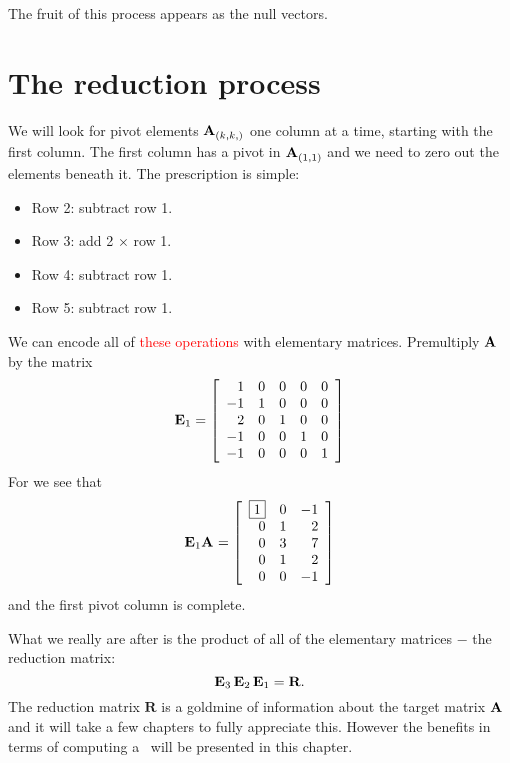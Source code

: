 The fruit of this process appears as the null vectors.


\section{The reduction process}
We will look for pivot elements $\textbf{A}^{\mathrm{}}_{\left( k,k, \right)}$ one column at a time, starting with the first column. The first column has a pivot in $\textbf{A}^{\mathrm{}}_{\left( 1,1 \right)}$ and we need to zero out the elements beneath it. The prescription is simple:
\begin{itemize}
\item Row 2: subtract row 1.
\item Row 3: add 2 $\times $ row 1.
\item Row 4: subtract row 1.
\item Row 5: subtract row 1.
\end{itemize}
We can encode all of \textcolor{red}{these operations} with elementary matrices. Premultiply $\textbf{A}^{\mathrm{}}$ by the matrix
\begin{equation}
\textbf{E}_{1} = 
\left[
\begin{array}{ rrrrr }
  1 & 0 & 0 & 0 & 0 \\
 -1 & 1 & 0 & 0 & 0 \\
  2 & 0 & 1 & 0 & 0 \\
 -1 & 0 & 0 & 1 & 0 \\
 -1 & 0 & 0 & 0 & 1
\end{array}
\right]
\end{equation}
For we see that
\begin{equation}
 \textbf{E}_{1} \textbf{A}^{\mathrm{}} = 
\left[
\begin{array}{ rrr }
 \boxed{1} & 0 & -1 \\
 0 & 1 & 2 \\
 0 & 3 & 7 \\
 0 & 1 & 2 \\
 0 & 0 & -1
\end{array}
\right]
\end{equation}
and the first pivot column is complete.

What we really are after is the product of all of the elementary matrices $-$ the reduction matrix:
\begin{equation}
  \textbf{E}_{3} \, \textbf{E}_{2} \, \textbf{E}_{1} = \textbf{R}.
\end{equation}
The reduction matrix $\textbf{R}$ is a goldmine of information about the target matrix $\textbf{A}^{\mathrm{}}$ and it will take a few chapters to fully appreciate this. However the benefits in terms of computing a \svdl \ will be presented in this chapter.

